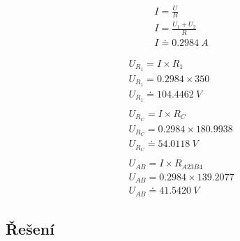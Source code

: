 \begin{figure}
    \begin{gather*}
        I = \frac{U}{R} \\
        I = \frac{U_1 + U_2}{R} \\
        I \doteq 0.2984 \: A
    \end{gather*}
\end{figure}


\begin{figure}
    \begin{gather*}
        U_{R_1} = I \times R_1 \\
        U_{R_1} = 0.2984 \times 350 \\
        U_{R_1} \doteq 104.4462 \: V \\
        \\
        U_{R_C} = I \times R_C \\
        U_{R_C} = 0.2984 \times 180.9938 \\
        U_{R_C} \doteq 54.0118 \: V \\
        \\
        U_{AB} = I \times R_{A23B4} \\
        U_{AB} = 0.2984 \times 139.2077 \\
        U_{AB} \doteq 41.5420 \: V
    \end{gather*}
\end{figure}

\clearpage
\subsection{Řešení}

\clearpage